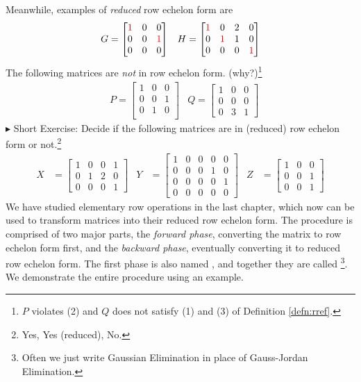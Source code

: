 Meanwhile, examples of \textit{reduced} row echelon form are
\begin{align*}
& G =
\begin{bmatrix}
\textcolor{red}{1} & 0 & 0 \\
0 & 0 & \textcolor{red}{1}\\
0 & 0 & 0 
\end{bmatrix}
& H =
\begin{bmatrix}
\textcolor{red}{1} & 0 & 2 & 0 \\
0 & \textcolor{red}{1} & 1 & 0 \\
0 & 0 & 0 & \textcolor{red}{1}
\end{bmatrix}
\end{align*}
The following matrices are \textit{not} in row echelon form. (why?)\footnote{$P$ violates (2) and $Q$ does not satisfy (1) and (3) of Definition \ref{defn:rref}.}
\begin{align*}
& P =
\begin{bmatrix}
1 & 0 & 0 \\
0 & 0 & 1 \\
0 & 1 & 0 \\
\end{bmatrix}
& Q =
\begin{bmatrix}
1 & 0 & 0 \\
0 & 0 & 0 \\
0 & 3 & 1
\end{bmatrix}
\end{align*}
$\blacktriangleright$ Short Exercise: Decide if the following matrices are in (reduced) row echelon form or not.\footnote{Yes, Yes (reduced), No.}
\begin{align*}
X &= 
\begin{bmatrix}
1 & 0 & 0 & 1 \\
0 & 1 & 2 & 0 \\
0 & 0 & 0 & 1
\end{bmatrix}
& Y&=
\begin{bmatrix}
1 & 0 & 0 & 0 & 0 \\
0 & 0 & 0 & 1 & 0 \\
0 & 0 & 0 & 0 & 1 \\
0 & 0 & 0 & 0 & 0
\end{bmatrix}
& Z&=
\begin{bmatrix}
1 & 0 & 0 \\
0 & 0 & 1 \\
0 & 0 & 1 
\end{bmatrix}
\end{align*}
We have studied elementary row operations in the last chapter, which now can be used to transform matrices into their reduced row echelon form. The procedure is comprised of two major parts, the \textit{forward phase}, converting the matrix to row echelon form first, and the \textit{backward phase}, eventually converting it to reduced row echelon form. The first phase is also named , and together they are called \footnote{Often we just write Gaussian Elimination in place of Gauss-Jordan Elimination.}. We demonstrate the entire procedure using an example.
